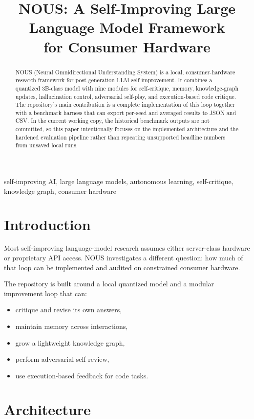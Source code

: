 \documentclass[conference]{IEEEtran}
\title{NOUS: A Self-Improving Large Language Model Framework\\for Consumer Hardware}
\author{
  \IEEEauthorblockN{George David Tsitlauri}
  \IEEEauthorblockA{
    \textit{Dept. of Informatics \& Telecommunications}\\
    \textit{University of Thessaly, Greece}\\
    gdtsitlauri@gmail.com
  }
}
\begin{document}
\maketitle

\begin{abstract}
NOUS (Neural Omnidirectional Understanding System) is a local, consumer-hardware
research framework for post-generation LLM self-improvement. It combines a
quantized 3B-class model with nine modules for self-critique, memory,
knowledge-graph updates, hallucination control, adversarial self-play, and
execution-based code critique. The repository's main contribution is a complete
implementation of this loop together with a benchmark harness that can export
per-seed and averaged results to JSON and CSV. In the current working copy, the
historical benchmark outputs are not committed, so this paper intentionally
focuses on the implemented architecture and the hardened evaluation pipeline
rather than repeating unsupported headline numbers from unsaved local runs.
\end{abstract}

\begin{IEEEkeywords}
self-improving AI, large language models, autonomous learning, self-critique, knowledge graph, consumer hardware
\end{IEEEkeywords}

\section{Introduction}

Most self-improving language-model research assumes either server-class hardware
or proprietary API access. NOUS investigates a different question: how much of
that loop can be implemented and audited on constrained consumer hardware.

The repository is built around a local quantized model and a modular improvement
loop that can:
\begin{itemize}
  \item critique and revise its own answers,
  \item maintain memory across interactions,
  \item grow a lightweight knowledge graph,
  \item perform adversarial self-review,
  \item use execution-based feedback for code tasks.
\end{itemize}

\section{Architecture}
\end{document}
